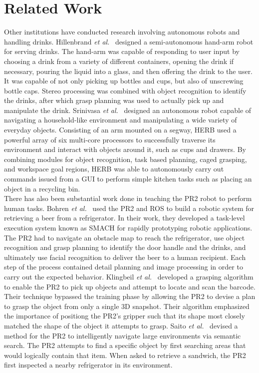 \documentclass{sig-alternate}
\begin{document}
\section{Related Work}
\label{sec:related_work}
Other institutions have conducted research involving autonomous robots and handling drinks. Hillenbrand \textit{et al.}~\cite{pouring_arm} designed a semi-autonomous hand-arm robot for serving drinks. The hand-arm was capable of responding to user input by choosing a drink from a variety of different containers, opening the drink if necessary, pouring the liquid into a glass, and then offering the drink to the user. It was capable of not only picking up bottles and cups, but also of unscrewing bottle caps. Stereo processing was combined with object recognition to identify the drinks, after which grasp planning was used to actually pick up and manipulate the drink. Srinivasa \textit{et al.}~\cite{herb} designed an autonomous robot capable of navigating a household-like environment and manipulating a wide variety of everyday objects. Consisting of an arm mounted on a segway, HERB used a powerful array of six multi-core processors to successfully traverse its environment and interact with objects around it, such as cups and drawers. By combining modules for object recognition, task based planning, caged grasping, and workspace goal regions, HERB was able to autonomously carry out commands issued from a GUI to perform simple kitchen tasks such as placing an object in a recycling bin.\\
There has also been substantial work done in teaching the PR2 robot to perform human tasks. Bohren \textit{et al.}~\cite{beer} used the PR2 and ROS to build a robotic system for retrieving a beer from a refrigerator. In their work, they developed a task-level execution system known as SMACH for rapidly prototyping robotic applications. The PR2 had to navigate an obstacle map to reach the refrigerator, use object recognition and grasp planning to identify the door handle and the drinks, and ultimately use facial recognition to deliver the beer to a human recipient. Each step of the process contained detail planning and image processing in order to carry out the expected behavior. Klingbeil \textit{et al.}~\cite{groceries} developed a grasping algorithm to enable the PR2 to pick up objects and attempt to locate and scan the barcode. Their technique bypassed the training phase by allowing the PR2 to devise a plan to grasp the object from only a single 3D snapshot. Their algorithm emphasized the importance of positiong the PR2's gripper such that its shape most closely matched the shape of the object it attempts to grasp. Saito \textit{et al.}~\cite{subway} devised a method for the PR2 to intelligently navigate large environments via semantic search. The PR2 attempts to find a specific object by first searching areas that would logically contain that item. When asked to retrieve a sandwich, the PR2 first inspected a nearby refrigerator in its environment.\\ 
\end{document}
